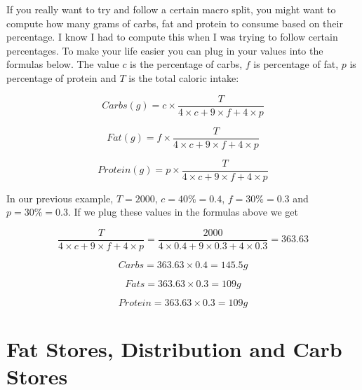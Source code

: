\documentclass[openany, 12pt]{book}
\begin{document}
	If you really want to try and follow a certain macro split, you might want to compute how many grams of carbs, fat and protein to consume based on their percentage. I know
	I had to compute this when I was trying to follow certain percentages. To make your life easier you can plug in your values into the formulas below. The value $c$ is the 
	percentage of carbs, $f$ is percentage of fat, $p$ is percentage of protein and $T$ is the total caloric intake:
	
	\begin{equation}
		Carbs(g) = c \times \frac{T}{4 \times c + 9 \times f + 4 \times p}
	\end{equation}
	
	\begin{equation}
		Fat(g) = f \times \frac{T}{4 \times c + 9 \times f + 4 \times p}
	\end{equation}
		
	\begin{equation}
		Protein(g) = p \times \frac{T}{4 \times c + 9 \times f + 4 \times p}
	\end{equation}
	
	In our previous example, $T = 2000$, $c = 40\% = 0.4$, $f = 30\% = 0.3$ and $p = 30\% = 0.3$. If we plug these values in the formulas above we get
	
	$$ \frac{T}{4 \times c + 9 \times f + 4 \times p} = \frac{2000}{4 \times 0.4 + 9 \times 0.3 + 4 \times 0.3} = 363.63 $$
	
	$$ Carbs = 363.63 \times 0.4 = 145.5g $$
	
	$$ Fats = 363.63 \times 0.3 = 109g $$

	$$ Protein = 363.63 \times 0.3 = 109g $$		
	
	\section{Fat Stores, Distribution and Carb Stores}
	
\end{document}
